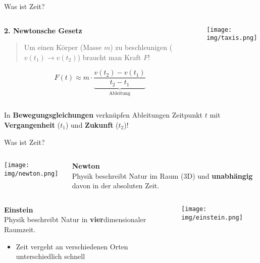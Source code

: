 \begin{frame}{Was ist Zeit?}
    \begin{columns}
        \begin{column}{.55\textwidth}
            \textbf{2. Newtonsche Gesetz}
            \begin{quote}
            Um einen Körper (Masse $m$) zu beschleunigen ($v(t_1) \to v(t_2)$) braucht man Kraft $F$!
            \end{quote}

            \begin{equation*}
                F(t) \approx m \cdot \underbrace{\frac{v(t_2) - v(t_1)}{t_2 - t_1}}_{\text{Ableitung}}
            \end{equation*}
        \end{column}
        \begin{column}{.45\textwidth}
            \centering
            \texttt{[image: img/taxis.png]}\\
        \end{column}
    \end{columns}

    \centering
    In \textbf{Bewegungsgleichungen} verknüpfen Ableitungen Zeitpunkt $t$ mit \textbf{Vergangenheit} ($t_1$) und \textbf{Zukunft} ($t_2$)!
\end{frame}

\begin{frame}{Was ist Zeit?}
    \begin{columns}
        \begin{column}{.35\textwidth}
            \centering
            \texttt{[image: img/newton.png]}\\
            \centering
            \scalebox{.4}{(After Godfrey Kneller [Public domain])}
        \end{column}
        \begin{column}{.65\textwidth}
            \textbf{Newton}\\
            Physik beschreibt Natur im Raum (3D) und \textbf{unabhängig} davon in der absoluten Zeit.
        \end{column}
    \end{columns}
    \begin{columns}
        \begin{column}{.65\textwidth}
            \textbf{Einstein}\\
            Physik beschreibt Natur in \textbf{vier}dimensionaler Raumzeit.
            \begin{itemize}
                \item Zeit vergeht an verschiedenen Orten unterschiedlich schnell
            \end{itemize}
        \end{column}
        \begin{column}{.35\textwidth}
            \centering
            \texttt{[image: img/einstein.png]}\\
            \centering
            \scalebox{.4}{(Ferdinand Schmutzer [Public domain])}
        \end{column}
    \end{columns}
\end{frame}

